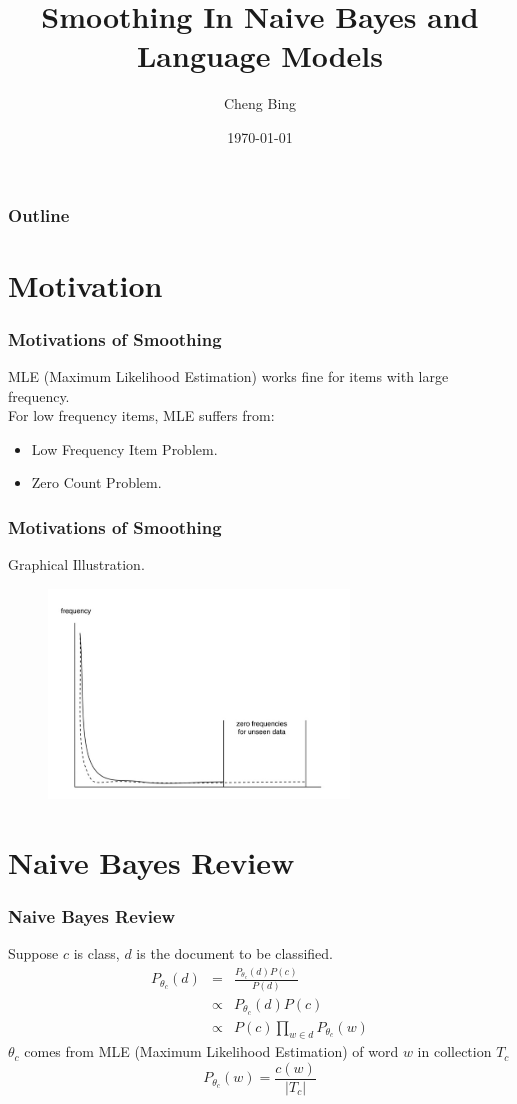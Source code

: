 \documentclass{beamer}
\begin{document}
\title{Smoothing In Naive Bayes and Language Models}
\author{Cheng Bing}
\date{\today}
\frame{\titlepage}

\begin{frame}
    \frametitle{Outline}
    \tableofcontents
\end{frame}

\section{Motivation}
\begin{frame}
\frametitle{Motivations of Smoothing}
MLE (Maximum Likelihood Estimation) works fine for items with large frequency. \\
For low frequency items, MLE suffers from:
\begin{itemize}
  \item Low Frequency Item Problem.
  \item Zero Count Problem.
\end{itemize}
\end{frame}

\begin{frame}
\frametitle{Motivations of Smoothing}
\begin{center}
Graphical Illustration.
\begin{figure}
  \includegraphics[width=8cm]{fig/smoothing-dis.jpg}\\
  \label{smoothing-dis}
\end{figure}
\end{center}
\end{frame}

\section{Naive Bayes Review}
\begin{frame}
\frametitle{Naive Bayes Review}
Suppose $c$ is class, $d$ is the document to be classified.
\begin{eqnarray*}
    P_{\theta_{c}}(d) &=& \frac{P_{\theta_{c}}(d)P(c)}{P(d)} \\
     & \varpropto & P_{\theta_{c}}(d)P(c) \\
     & \varpropto & P(c)\prod_{w \in d}P_{\theta_{c}}(w)
\end{eqnarray*}
$\theta_{c}$ comes from MLE (Maximum Likelihood Estimation) of word $w$ in collection $T_{c}$
\begin{equation*}
    P_{\theta_{c}}(w) = \frac{c(w)}{|T_{c}|}
\end{equation*}
\end{frame}
\end{document}
